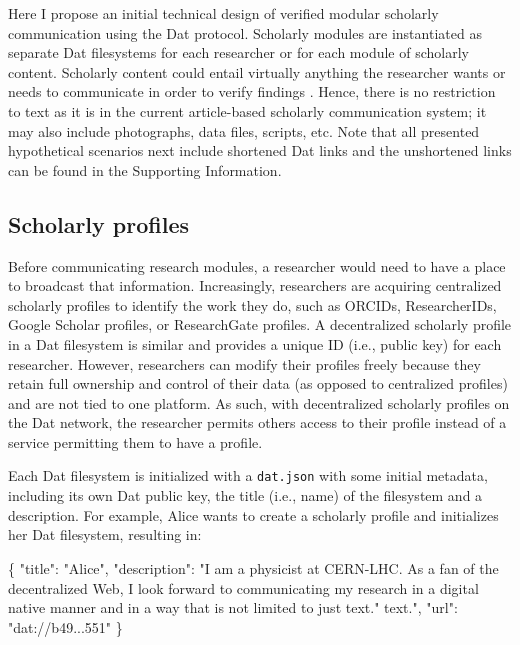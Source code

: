 \documentclass[publications,article,submit,moreauthors,pdftex,10pt,a4paper]{Definitions/mdpi}
\newenvironment{Shaded}{\begin{snugshade}}{\end{snugshade}}
\newcommand{\DataTypeTok}[1]{\textcolor[rgb]{0.13,0.29,0.53}{#1}}
\newcommand{\FunctionTok}[1]{\textcolor[rgb]{0.00,0.00,0.00}{#1}}
\newcommand{\StringTok}[1]{\textcolor[rgb]{0.31,0.60,0.02}{#1}}
\begin{document}
Here I propose an initial technical design of verified modular scholarly communication using the Dat protocol. Scholarly modules are instantiated as separate Dat filesystems for each researcher or for each module of scholarly content. Scholarly content could entail virtually anything the researcher wants or needs to communicate in order to verify findings \citep[see also ][]{doi:10.3390/publications6020021}. Hence, there is no restriction to text as it is in the current article-based scholarly communication system; it may also include photographs, data files, scripts, etc. Note that all presented hypothetical scenarios next include shortened Dat links and the unshortened links can be found in the Supporting Information.

\subsection*{Scholarly profiles}\label{scholarly-profiles}

Before communicating research modules, a researcher would need to have a
place to broadcast that information. Increasingly, researchers are
acquiring centralized scholarly profiles to identify the work they do,
such as ORCIDs, ResearcherIDs, Google Scholar profiles, or ResearchGate
profiles. A decentralized scholarly profile in a Dat filesystem is
similar and provides a unique ID (i.e., public key) for each researcher.
However, researchers can modify their profiles freely because they
retain full ownership and control of their data (as opposed to
centralized profiles) and are not tied to one platform. As such, with
decentralized scholarly profiles on the Dat network, the researcher
permits others access to their profile instead of a service permitting
them to have a profile.

Each Dat filesystem is initialized with a \texttt{dat.json} with some
initial metadata, including its own Dat public key, the title (i.e.,
name) of the filesystem and a description. For example, Alice wants to
create a scholarly profile and initializes her Dat filesystem, resulting
in:

\begin{Shaded}
\begin{Highlighting}[]
\FunctionTok{\{}
  \DataTypeTok{"title"}\FunctionTok{:} \StringTok{"Alice"}\FunctionTok{,}
  \DataTypeTok{"description"}\FunctionTok{:} \StringTok{"I am a physicist at CERN-LHC. As a fan of the }
  \StringTok{decentralized Web, I look forward to communicating my research in }
  \StringTok{a digital native manner and in a way that is not limited to just text."}
  \StringTok{text."}\FunctionTok{,}
  \DataTypeTok{"url"}\FunctionTok{:} \StringTok{"dat://b49...551"}
\FunctionTok{\}}
\end{Highlighting}
\end{Shaded}
\end{document}

